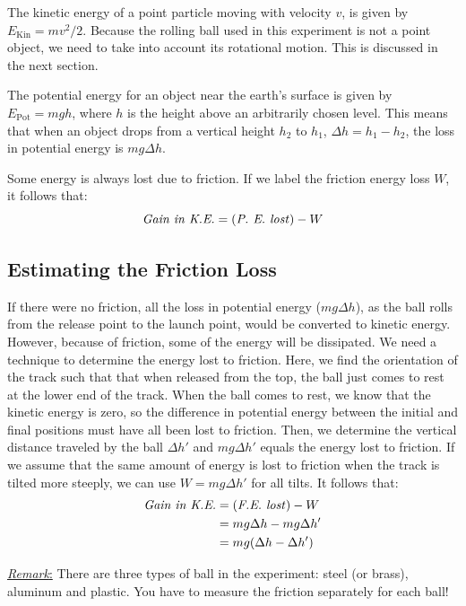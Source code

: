 The kinetic energy of a point particle moving with velocity $v$, is given by $E_{\textrm{Kin}}=mv^2/2$. Because the rolling ball used in this experiment is not a point object, we need to take into account its rotational motion. This is discussed in the next section. \myskip

The potential energy for an object near the earth’s surface is given by $E_{\textrm{Pot}}=mgh$, where $h$ is the height above an arbitrarily chosen level. This means that when an object drops from a vertical height $h_2$ to $h_1$, $\Delta h=h_1-h_2$, the loss in potential energy is $mg\Delta h$.\myskip

Some energy is always lost due to friction. If we label the friction energy loss $W$, it follows that:
\begin{equation}
\textrm{\emph{Gain in K.E.}} = (\textrm{\emph{P. E. lost}}) - W
\end{equation}

\subsection{Estimating the Friction Loss}

If there were no friction, all the loss in potential energy ($mg\Delta h$), as the ball rolls from the release point to the launch point, would be converted to kinetic energy. However, because of friction, some of the energy will be dissipated. We need a technique to determine the energy lost to friction. Here, we find the orientation of the track such that that when released from the top, the ball just comes to rest at the lower end of the track. When the ball comes to rest, we know that the kinetic energy is zero, so the difference in potential energy between the initial and final positions must have all been lost to friction. Then, we determine the vertical distance traveled by the ball $\Delta h'$ and $mg\Delta h'$ equals the energy lost to friction. If we assume that the same amount of energy is lost to friction when the track is tilted more steeply, we can use $W=mg\Delta h'$ for all tilts. It follows that:
\begin{align}
  \textrm{\emph{Gain in K.E.}}&=(\textrm{\emph{F.E. lost}})-W\\
  &=mg\Delta h-mg\Delta h'\\
  &=mg(\Delta h-\Delta h')
\end{align}

\underline{\emph{Remark}:} There are three types of ball in the experiment: steel (or brass), aluminum and plastic. You have to measure the friction separately for each ball!

